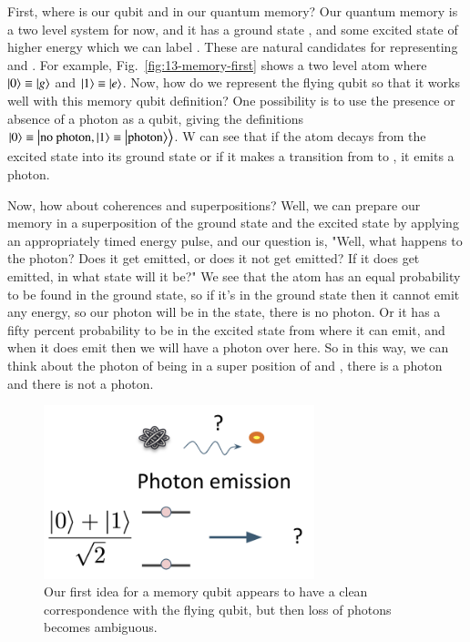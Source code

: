 First, where is our qubit  and  in our quantum memory? Our quantum memory is a two level system for now, and it has a ground state , and some excited state of higher energy which we can label . These are natural candidates for representing  and . For example, Fig.~\ref{fig:13-memory-first} shows a two level atom where $\left| 0 \right\rangle\equiv\left| g \right\rangle$ and $\left| 1 \right\rangle\equiv\left| e \right\rangle$. Now, how do we represent the flying qubit so that it works well with this memory qubit definition? One possibility is to use the presence or absence of a photon as a qubit, giving the definitions $\left| 0 \right\rangle\equiv\left| \textrm{no photon},\left| 1 \right\rangle\equiv\left| \textrm{photon} \right\rangle \right\rangle$.
W can see that if the atom decays from the excited state into its ground state or if it makes a transition from  to , it emits a photon.

\rdv{}
Now, how about coherences and superpositions? Well, we can prepare our memory in a superposition of the ground state and the excited state by applying an appropriately timed energy pulse, and our question is, "Well, what happens to the photon? Does it get emitted, or does it not get emitted? If it does get emitted, in what state will it be?" We see that the atom has an equal probability to be found in the ground state, so if it's in the ground state then it cannot emit any energy, so our photon will be in the  state, there is no photon. Or it has a fifty percent probability to be in the excited state from where it can emit, and when it does emit then we will have a photon over here. So in this way, we can think about the photon of being in a super position of  and , there is a photon and there is not a photon.

\begin{figure}[t]
    \centering
    \includegraphics[width=0.7\textwidth]{lesson13/memory-first-idea-problem.png}
    \caption[Problem with our first idea for memory]{Our first idea for a memory qubit appears to have a clean correspondence with the flying qubit, but then loss of photons becomes ambiguous.}
    \label{fig:13-memory-first-problem}
\end{figure}

